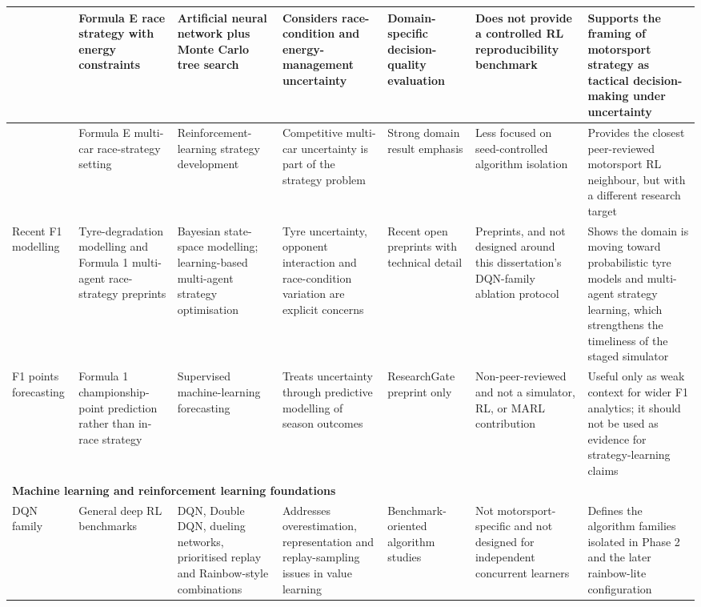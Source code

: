 \begin{appendices}
\begin{longtable}{|p{2.0cm}|p{2.1cm}|p{2.0cm}|p{2.0cm}|p{2.0cm}|p{2.2cm}|p{2.4cm}|}
\hline
\citealp{liu2020formulae} & Formula E race strategy with energy constraints & Artificial neural network plus Monte Carlo tree search & Considers race-condition and energy-management uncertainty & Domain-specific decision-quality evaluation & Does not provide a controlled RL reproducibility benchmark & Supports the framing of motorsport strategy as tactical decision-making under uncertainty \\
\hline
\citealp{liu2024formulae} & Formula E multi-car race-strategy setting & Reinforcement-learning strategy development & Competitive multi-car uncertainty is part of the strategy problem & Strong domain result emphasis & Less focused on seed-controlled algorithm isolation & Provides the closest peer-reviewed motorsport RL neighbour, but with a different research target \\
\hline
Recent F1 modelling \citep{cappello2025tires,fieni2026learning} & Tyre-degradation modelling and Formula 1 multi-agent race-strategy preprints & Bayesian state-space modelling; learning-based multi-agent strategy optimisation & Tyre uncertainty, opponent interaction and race-condition variation are explicit concerns & Recent open preprints with technical detail & Preprints, and not designed around this dissertation's DQN-family ablation protocol & Shows the domain is moving toward probabilistic tyre models and multi-agent strategy learning, which strengthens the timeliness of the staged simulator \\
\hline
F1 points forecasting \citep{bansal2025advanced} & Formula 1 championship-point prediction rather than in-race strategy & Supervised machine-learning forecasting & Treats uncertainty through predictive modelling of season outcomes & ResearchGate preprint only & Non-peer-reviewed and not a simulator, RL, or MARL contribution & Useful only as weak context for wider F1 analytics; it should not be used as evidence for strategy-learning claims \\
\hline
\multicolumn{7}{|l|}{\textbf{Machine learning and reinforcement learning foundations}}\\
\hline
DQN family \citep{mnih2015human,vanhasselt2016double,wang2016dueling,schaul2016prioritized,hessel2018rainbow} & General deep RL benchmarks & DQN, Double DQN, dueling networks, prioritised replay and Rainbow-style combinations & Addresses overestimation, representation and replay-sampling issues in value learning & Benchmark-oriented algorithm studies & Not motorsport-specific and not designed for independent concurrent learners & Defines the algorithm families isolated in Phase 2 and the later rainbow-lite configuration \\

\end{longtable}
\end{appendices}
